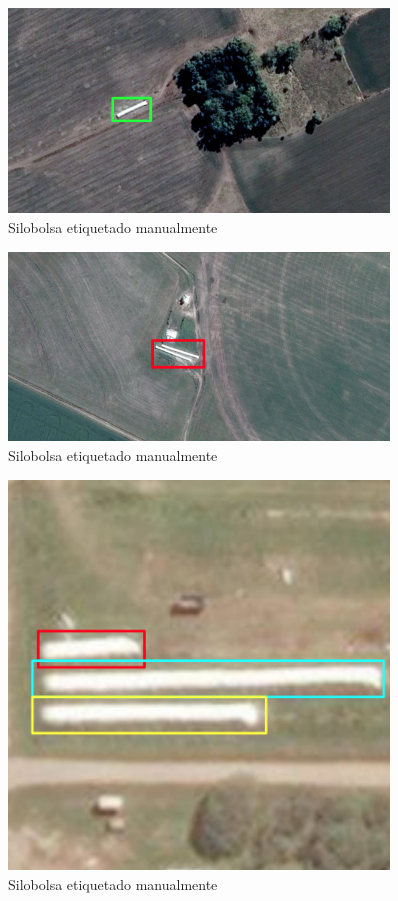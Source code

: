 \begin{figure}
    \centering
    \includegraphics[width=0.9\textwidth]{img/silobolsa etiquetado manual - 1.png}
    \caption{Silobolsa etiquetado manualmente}
    \label{Silobolsa etiquetado manualmento 1}
\end{figure}

\begin{figure}
    \centering
    \includegraphics[width=0.9\textwidth]{img/silobolsa etiquetado manual - 2.png}
    \caption{Silobolsa etiquetado manualmente}
    \label{Silobolsa etiquetado manualmento 2}
\end{figure}

\begin{figure}
    \centering
    \includegraphics[width=0.9\textwidth]{img/silobolsa etiquetado manual - 3.png}
    \caption{Silobolsa etiquetado manualmente}
    \label{Silobolsa etiquetado manualmento 3}
\end{figure}

